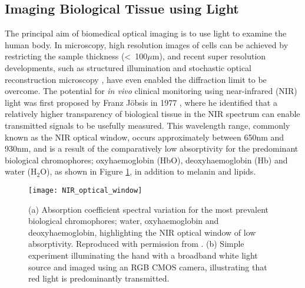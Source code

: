 \documentclass[twoside]{bhamthesis}
\theoremstyle{definition}
\begin{document}
\subsection{Imaging Biological Tissue using Light}

The principal aim of biomedical optical imaging is to use light to examine the human body. In microscopy, high resolution images of cells can be achieved by restricting the sample thickness (<~100$\mu$m), and recent super resolution developments, such as structured illumination \cite{gustafsson2000surpassing} and stochastic optical reconstruction microscopy \cite{rust2006sub}, have even enabled the diffraction limit to be overcome. The potential for \textit{in vivo} clinical monitoring using near-infrared (NIR) light was first proposed by Franz J\"obsis in 1977 \cite{jobsis1977noninvasive}, where he identified that a relatively higher transparency of biological tissue in the NIR spectrum can enable transmitted signals to be usefully measured. This wavelength range, commonly known as the NIR optical window, occurs approximately between 650nm and 930nm, and is a result of the comparatively low absorptivity for the predominant biological chromophores; oxyhaemoglobin (HbO), deoxyhaemoglobin (Hb) and water ($\mathrm{H_2O}$), as shown in Figure \ref{fig:NIR_window}, in addition to melanin and lipids. 

\begin{figure}[!ht]
  \centering
  \texttt{[image: NIR\_optical\_window]}
\caption{(a) Absorption coefficient spectral variation for the most prevalent biological chromophores; water, oxyhaemoglobin and deoxyhaemoglobin, highlighting the NIR optical window of low absorptivity. Reproduced with permission from \cite{phan2010practical}. (b) Simple experiment illuminating the hand with a broadband white light source and imaged using an RGB CMOS camera, illustrating that red light is predominantly transmitted.}
  \label{fig:NIR_window}
\end{figure}


\end{document}
